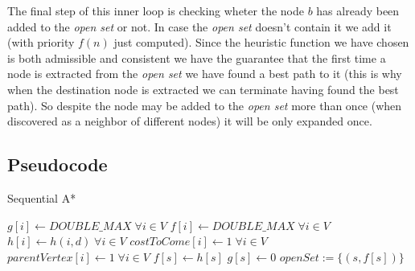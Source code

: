 \documentclass[twocolumn, switch]{article} %
\begin{document}
The final step of this inner loop is checking wheter the node $b$ has already been added to the 
\textit{open set} or not. In case the \textit{open set} doesn't contain it we add it (with priority
$f(n)$ just computed).
Since the heuristic function we have chosen is both admissible and consistent we have the guarantee 
that the first time a node is extracted from the \textit{open set} we have found a best path to it (this
is why when the destination node is extracted we can terminate having found the best path). So despite
the node may be added to the \textit{open set} more than once (when discovered as a neighbor of different nodes)
it will be only expanded once.
\subsection{Pseudocode}
\begin{algorithm}[ht!] 
\caption{Sequential A*}\label{alg:two}
$g[i] \gets DOUBLE\_MAX \;\forall i \in V$\;
$f[i] \gets DOUBLE\_MAX \;\forall i \in V$\;
$h[i] \gets h(i, d) \; \forall i \in V$\;
$costToCome[i] \gets 1 \; \forall i \in V$\;
$parentVertex[i] \gets 1 \; \forall i \in V$\;
$f[s] \gets h[s]$\;
$g[s] \gets 0$\;
$openSet := \{(s, f[s])\}$\;
\end{algorithm}
\end{document}
